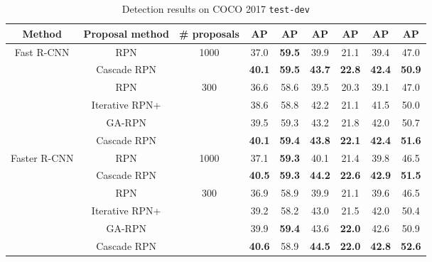 \documentclass{article}
\begin{document}
	\begin{table}[t]
		\small
		\centering
		\caption{Detection results on COCO 2017 \texttt{test-dev}}
		\begin{tabular}{ccccccccc} \toprule[1pt]
			Method                       & Proposal method & \# proposals & AP   & AP   & AP   & AP   & AP   & AP\\ \midrule[0.5pt]
			\multirow{5}{*}{Fast R-CNN}   & RPN & \multirow{2}{*}{1000}   & 37.0 & \textbf{59.5} & 39.9 & 21.1 & 39.4 & 47.0 \\ 
										  & Cascade RPN & & \textbf{40.1} & \textbf{59.5} & \textbf{43.7} & \textbf{22.8} & \textbf{42.4} & \textbf{50.9} \\ \cmidrule{2-9}
			& RPN             & \multirow{4}{*}{300} & 36.6 & 58.6 & 39.5 & 20.3 & 39.1 & 47.0 \\
			& Iterative RPN+  &           & 38.6 & 58.8 & 42.2 & 21.1 & 41.5 & 50.0 \\
			& GA-RPN          &           & 39.5 & 59.3 & 43.2 & 21.8 & 42.0 & 50.7 \\
			& Cascade RPN     &           & \textbf{40.1} & \textbf{59.4} & \textbf{43.8} & \textbf{22.1} & \textbf{42.4} & \textbf{51.6} \\ \midrule[0.5pt]
			\multirow{5}{*}{Faster R-CNN} & RPN  & \multirow{2}{*}{1000} & 37.1 & \textbf{59.3} & 40.1 & 21.4 & 39.8 & 46.5 \\
										  & Cascade RPN & & \textbf{40.5} & \textbf{59.3} & \textbf{44.2} & \textbf{22.6} & \textbf{42.9} & \textbf{51.5} \\ \cmidrule{2-9}\textbf{}
			& RPN             & \multirow{4}{*}{300}  & 36.9 & 58.9 & 39.9 & 21.1 & 39.6 & 46.5 \\
			& Iterative RPN+  & & 39.2 & 58.2 & 43.0 & 21.5 & 42.0 & 50.4 \\
			& GA-RPN          & & 39.9 & \textbf{59.4} & 43.6 & \textbf{22.0} & 42.6 & 50.9 \\
			& Cascade RPN     & & \textbf{40.6} & 58.9 & \textbf{44.5} & \textbf{22.0} & \textbf{42.8} & \textbf{52.6} \\ \toprule[1pt]
		\end{tabular}
		\label{tab:detection_benchmark}
	\end{table}
\end{document}
